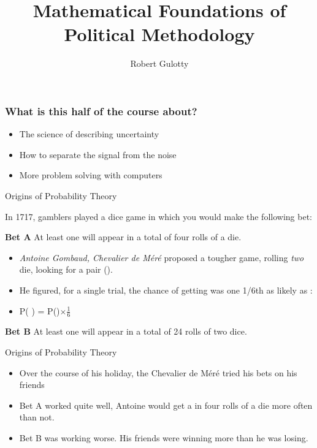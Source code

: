 \documentclass{beamer}
\title[PLSC 43401]{Mathematical Foundations of Political Methodology}
\author{Robert Gulotty}
\institute[Chicago]{University of Chicago}
\def\die#1{{\domino#1}}
\numberwithin{equation}{section}
\begin{document}
\begin{frame}
\maketitle
\end{frame}
\begin{frame}
\frametitle{What is this half of the course about?}
\begin{itemize}
\item The science of describing uncertainty
\item How to separate the signal from the noise
\item More problem solving with computers
\end{itemize}
\end{frame}






\begin{frame}{Origins of Probability Theory}

In 1717, gamblers played a dice game in which you would make the following bet:
\begin{tcolorbox}
\textbf{Bet A} At least one \die1 will appear in a total of four rolls of a die.\\
\end{tcolorbox}
\pause
\begin{itemize}
\item \emph{Antoine Gombaud, Chevalier de M\'{e}r\'{e}} proposed a tougher game, rolling \emph{two} die, looking for a pair (\die1\die1).\\
\pause
\item He figured, for a single trial, the chance of getting \die1\die1 was one 1/6th as likely as \die1 : \pause
\item[$\rightarrow$] P( \die1\die1) =  P(\die1)$\times\frac{1}{6}$
\pause
  
\end{itemize}
\begin{tcolorbox}
\textbf{Bet B}  At least one \die1\die1 will appear in a total of 24 rolls of two dice.
\end{tcolorbox}
\end{frame}

\begin{frame}{Origins of Probability Theory}

\begin{itemize}
\item Over the course of his holiday, the Chevalier de M\'{e}r\'{e} tried his bets on his friends 
\item Bet A worked quite well, Antoine would get a \die1 in four rolls of a die more often than not. \pause
\item Bet B was working worse. His friends were winning more than he was losing.
\end{itemize}
\end{frame}
\end{document}
